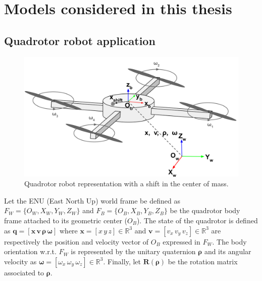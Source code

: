 \section{Models considered in this thesis}

\subsection{Quadrotor robot application} \label{sec:quad_model}

\begin{figure} [t]
    \centering
    \includegraphics[width=0.8\linewidth]{figures/models/drone.png} 
    \caption{Quadrotor robot representation with a shift in the center of mass.}%
    \label{fig:quad}%
\end{figure}

Let the ENU (East North Up) world frame be defined as $F_W \allowbreak = \allowbreak \{O_W, \allowbreak X_W, \allowbreak Y_W, \allowbreak Z_W\}$ and $F_B = \allowbreak\{O_B, \allowbreak X_B, \allowbreak Y_B, \allowbreak Z_B\}$ be the quadrotor body frame attached to its geometric center ($O_B$).
The state of the quadrotor is defined as $\boldsymbol{q} = [\boldsymbol{x}  \, \boldsymbol{v} \, \boldsymbol{\rho} \, \boldsymbol{\omega}]$ where $\boldsymbol{x} = [x \, y \,z] \in \mathbb{R}^{3}$ and $\boldsymbol{v} = [v_x \, v_y \,v_z] \in \mathbb{R}^{3}$ are respectively the position and velocity vector of $O_B$ expressed in $F_W$. The body orientation w.r.t. $F_W$ is represented by the unitary quaternion  $\boldsymbol{\rho}$ and its angular velocity as $\boldsymbol{\omega} = [\omega_x \, \omega_y \, \omega_z] \in \mathbb{R}^{3}$. 
Finally, let $\boldsymbol{R(\rho)}$ be the rotation matrix associated to $\boldsymbol{\rho}$.

